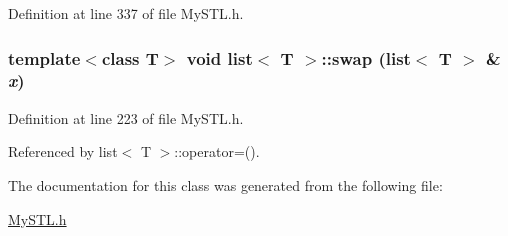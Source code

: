 Definition at line 337 of file MySTL.h.

\subsubsection[{swap}]{\setlength{\rightskip}{0pt plus 5cm}template$<$class T$>$ void {\bf list}$<$ T $>$::swap ({\bf list}$<$ T $>$ \& {\em x})}\label{classlist_a858ae65ee54f66b557c468be53e20925}


Definition at line 223 of file MySTL.h.



Referenced by list$<$ T $>$::operator=().



The documentation for this class was generated from the following file:\begin{DoxyCompactItemize}
\item 
\hyperlink{MySTL_8h}{MySTL.h}\end{DoxyCompactItemize}
